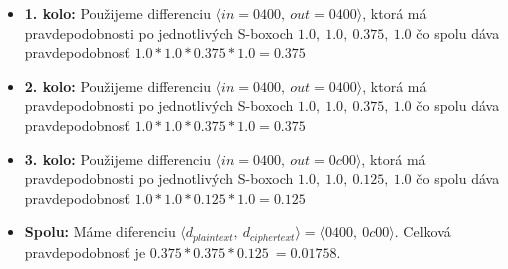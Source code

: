 \begin{itemize}
\item {\bf 1. kolo:}
Použijeme differenciu $\langle in= 0400 ,\ out= 0400 \rangle $,
ktorá má pravdepodobnosti po jednotlivých S-boxoch $
1.0,\ 1.0,\ 0.375,\ 1.0
$ čo spolu dáva pravdepodobnosť 
$ 1.0*1.0*0.375*1.0 = 0.375 $

\item {\bf 2. kolo:}
Použijeme differenciu $\langle in= 0400 ,\ out= 0400 \rangle $,
ktorá má pravdepodobnosti po jednotlivých S-boxoch $
1.0,\ 1.0,\ 0.375,\ 1.0
$ čo spolu dáva pravdepodobnosť 
$ 1.0*1.0*0.375*1.0 = 0.375 $

\item {\bf 3. kolo:}
Použijeme differenciu $\langle in= 0400 ,\ out= 0c00 \rangle $,
ktorá má pravdepodobnosti po jednotlivých S-boxoch $
1.0,\ 1.0,\ 0.125,\ 1.0
$ čo spolu dáva pravdepodobnosť 
$ 1.0*1.0*0.125*1.0 = 0.125 $

\item {\bf Spolu:}  Máme diferenciu $\langle d_{plaintext},\  d_{ciphertext} \rangle = \langle 0400 ,\  0c00 \rangle$.
Celková pravdepodobnosť je $ 0.375*0.375*0.125 ~= 0.01758 $.
\end{itemize}
